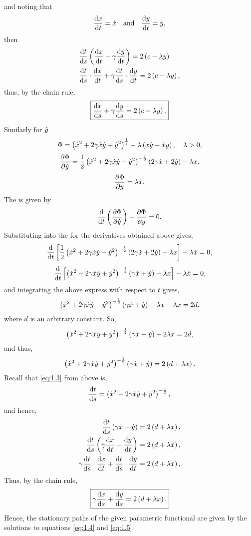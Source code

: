 and noting that
\begin{equation*}
	\frac{\mathrm{d}x}{\mathrm{d}t} = \dot{x} \quad \textrm{and} \quad \frac{\mathrm{d}y}{\mathrm{d}t} = \dot{y},
\end{equation*}
then
\begin{align*}
	{}&\frac{\mathrm{d}t}{\mathrm{d}s}\left(\frac{\mathrm{d}x}{\mathrm{d}t} + \gamma\frac{\mathrm{d}y}{\mathrm{d}t}\right) = 2\left(c - \lambda y\right)\\
	{}&\frac{\mathrm{d}t}{\mathrm{d}s}\cdot\frac{\mathrm{d}x}{\mathrm{d}t} + \gamma\frac{\mathrm{d}t}{\mathrm{d}s}\cdot\frac{\mathrm{d}y}{\mathrm{d}t} = 2\left(c - \lambda y\right),
\end{align*}
thus, by the chain rule,
\begin{equation}
	\label{eq:1.4}
	\boxed{\frac{\mathrm{d}x}{\mathrm{d}s} + \gamma\frac{\mathrm{d}y}{\mathrm{d}s} = 2\left(c - \lambda y\right).}
\end{equation}
Similarly for $\dot{y}$
\[
	\Phi =\left(\dot{x}^2 + 2\gamma\dot{x}\dot{y} + \dot{y}^2\right)^{\frac{1}{2}} - \lambda\left(x\dot{y} - \dot{x} y\right),\quad \lambda > 0,
\]
\[
	\frac{\partial \Phi}{\partial \dot{y}} = \frac{1}{2}\left(\dot{x}^2 + 2\gamma\dot{x}\dot{y} + \dot{y}^2\right)^{-\frac{1}{2}}\left(2\gamma\dot{x} + 2\dot{y}\right) - \lambda x.
\]
\[
	\frac{\partial \Phi}{\partial y} = \lambda\dot{x}.
\]
The \el is given by
\[
	\frac{\mathrm{d}}{\mathrm{d}t}\left(\frac{\partial \Phi}{\partial \dot{y}}\right)-\frac{\partial \Phi}{\partial y} = 0.
\]
Substituting into the \el for the derivatives obtained above gives,
\[
	\frac{\mathrm{d}}{\mathrm{d}t}\left[\frac{1}{2}\left(\dot{x}^2 + 2\gamma\dot{x}\dot{y} + \dot{y}^2\right)^{-\frac{1}{2}}\left(2\gamma\dot{x} + 2\dot{y}\right) - \lambda x\right] - \lambda \dot{x} = 0,
\]
\[
	\frac{\mathrm{d}}{\mathrm{d}t}\left[\left(\dot{x}^2 + 2\gamma\dot{x}\dot{y} + \dot{y}^2\right)^{-\frac{1}{2}}\left(\gamma\dot{x} + \dot{y}\right) - \lambda x\right] - \lambda \dot{x} = 0,
\]
and integrating the above express with respect to $t$ gives,
\[
	\left(\dot{x}^2 + 2\gamma\dot{x}\dot{y} + \dot{y}^2\right)^{-\frac{1}{2}}\left(\gamma\dot{x} + \dot{y}\right) - \lambda x - \lambda x = 2d,
\]
where $d$ is an arbitrary constant. So,
\[
	\left(\dot{x}^2 + 2\gamma\dot{x}\dot{y} + \dot{y}^2\right)^{-\frac{1}{2}}\left(\gamma\dot{x} + \dot{y}\right) - 2 \lambda x = 2d,
\]
and thus,
\begin{equation*}
	\left(\dot{x}^2 + 2\gamma\dot{x}\dot{y} + \dot{y}^2\right)^{-\frac{1}{2}}\left(\gamma\dot{x} + \dot{y}\right) = 2\left(d + \lambda x\right).
\end{equation*}
Recall that \eqref{eq:1.3} from above is,
\begin{equation*}
	\frac{\mathrm{d}t}{\mathrm{d}s} = \left(\dot{x}^2 + 2\gamma\dot{x}\dot{y} + \dot{y}^2\right)^{-\frac{1}{2}},
\end{equation*}
and hence,
\begin{align*}
	\frac{\mathrm{d}t}{\mathrm{d}s}\left(\gamma\dot{x} + \dot{y}\right) = 2\left(d + \lambda x\right),\\
	\frac{\mathrm{d}t}{\mathrm{d}s}\left(\gamma\frac{\mathrm{d}x}{\mathrm{d}t} +\frac{\mathrm{d}y}{\mathrm{d}t}\right) = 2\left(d+\lambda x\right),\\
	\gamma\frac{\mathrm{d}t}{\mathrm{d}s}\cdot\frac{\mathrm{d}x}{\mathrm{d}t} + \frac{\mathrm{d}t}{\mathrm{d}s}\cdot\frac{\mathrm{d}y}{\mathrm{d}t} = 2\left(d+\lambda x\right),\\
\end{align*}
Thus, by the chain rule,
\begin{equation}
	\label{eq:1.5}
	\boxed{\gamma\frac{\mathrm{d}x}{\mathrm{d}s} + \frac{\mathrm{d}y}{\mathrm{d}s} = 2\left(d + \lambda x\right).}
\end{equation}
Hence, the stationary paths of the given parametric functional are given by the solutions to equations \eqref{eq:1.4} and \eqref{eq:1.5}.